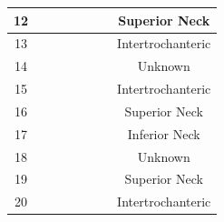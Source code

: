 \begin{table}
\begin{center}
\begin{tabular}{|c||>{\centering}p{2em}|>{\centering}p{2em}|>{\centering}p{2em}|>{\centering}p{2em}|>{\centering}p{2em}|>{\centering}p{2em}|c|}
			\hline 12		& \checkmark &  &  &  &  & 			& Superior Neck		\\ 
			
			\hline 13		& \checkmark &  &  &  &  & 			& Intertrochanteric	\\ 
			
			\hline 14		& \checkmark &  &  &  &  & 			& Unknown		\\ 
			
			\hline 15		&  & \checkmark &  &  &  &  		& Intertrochanteric	\\ 
			
			\hline 16		& \checkmark &  &  &  &  & 			& Superior Neck		\\ 
			
			\hline 17		& \checkmark &  &  &  &  & 			& Inferior Neck		\\ 
			
			\hline 18		&  & \checkmark &  &  &  &  		& Unknown		\\ 
			
			\hline 19		&  & \checkmark &  &  &  &  		& Superior Neck		\\ 
			
			\hline 20		&  & \checkmark &  &  &  &  		& Intertrochanteric	\\ 
			
			\hline 
		\end{tabular}
	\end{center}
\end{table}


